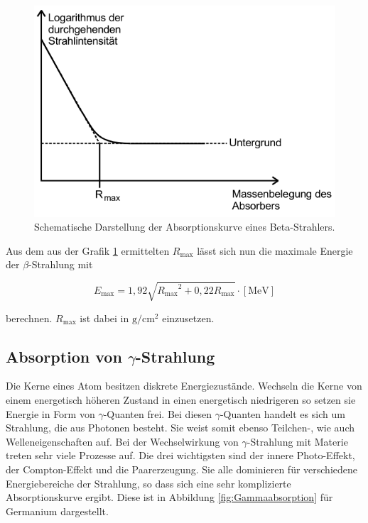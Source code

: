 \begin{figure}
  \centering
  \includegraphics[scale=0.7]{pictures/betaabsorption.png}
  \caption{Schematische Darstellung der Absorptionskurve eines Beta-Strahlers.\cite{sample}}
  \label{fig:betaabsorption}
\end{figure}

Aus dem aus der Grafik \ref{fig:betaabsorption} ermittelten $R_\text{max}$ lässt sich nun die maximale Energie der $\beta$-Strahlung mit

\begin{equation}
  E_\text{max} = 1,92 \sqrt{{R_\text{max}}^2 + 0,22 R_\text{max}} \cdot [\si{\mega\electronvolt}]
  \label{eqn:betaenergie}
\end{equation}

berechnen. $R_\text{max}$ ist dabei in $\si{\gram\per\centi\metre\squared}$ einzusetzen.

\FloatBarrier
\subsection{Absorption von \texorpdfstring{$\gamma$}{gamma}-Strahlung}

Die Kerne eines Atom besitzen diskrete Energiezustände.
Wechseln die Kerne von einem energetisch höheren Zustand in einen energetisch niedrigeren so setzen sie Energie in Form von $\gamma$-Quanten frei.
Bei diesen $\gamma$-Quanten handelt es sich um Strahlung, die aus Photonen besteht.
Sie weist somit ebenso Teilchen-, wie auch Welleneigenschaften auf.
Bei der Wechselwirkung von $\gamma$-Strahlung mit Materie treten sehr viele Prozesse auf.
Die drei wichtigsten sind der innere Photo-Effekt, der Compton-Effekt und die Paarerzeugung.
Sie alle dominieren für verschiedene Energiebereiche der Strahlung, so dass sich eine sehr komplizierte Absorptionskurve ergibt.
Diese ist in Abbildung \ref{fig:Gammaabsorption} für Germanium dargestellt.

